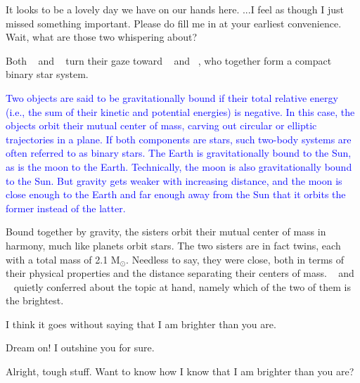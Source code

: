 \documentclass[main.tex]{subfiles}
\begin{document}
\par \Electra It looks to be a lovely day we have on our hands here. ...I feel as though I just missed something important.  Please do fill me in at your earliest convenience.  Wait, what are those two whispering about?

\par \nar Both \rmmaia~ and \rmelectra~ turn their gaze toward \rmtaygete~ and \rmalcyone~, who together form a compact binary star system.

\begin{tcolorbox}[sharp corners, colback=blue!30, colframe=blue!80!blue, title=Gravitationally Bound]
\par \textcolor{blue} {Two objects are said to be gravitationally bound if their total relative energy (i.e., the sum of their kinetic and potential energies) is negative.  In this case, the objects orbit their mutual center of mass, carving out circular or elliptic trajectories in a plane.  If both components are stars, such two-body systems are often referred to as binary stars.  The Earth is gravitationally bound to the Sun, as is the moon to the Earth.  Technically, the moon is also gravitationally bound to the Sun.  But gravity gets weaker with increasing distance, and the moon is close enough to the Earth and far enough away from the Sun that it orbits the former instead of the latter.}  
\end{tcolorbox}

\par \nar Bound together by gravity, the sisters orbit their mutual center of mass in harmony, much like planets orbit stars.  The two sisters are in fact twins, each with a total mass of 2.1 M$_{\odot}$.  Needless to say, they were close, both in terms of their physical properties and the distance separating their centers of mass.  \rmtaygete~ and \rmalcyone~ quietly conferred about the topic at hand, namely which of the two of them is the brightest.


\par \Taygete I think it goes without saying that I am brighter than you are.

\par \Alcyone Dream on!  I outshine you for sure.

\par \Taygete Alright, tough stuff.  Want to know how I know that I am brighter than you are?
\end{document}
